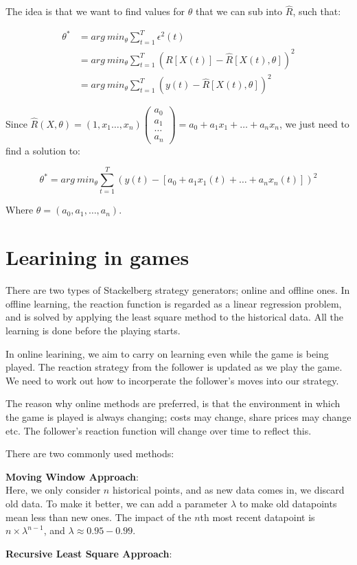 The idea is that we want to find values for $\theta$ that we can sub into
$\hat{R}$, such that:

\[
  \begin{split}
  \theta^* &= arg~min_\theta \sum^T_{t=1}\epsilon^2(t)\\
           &= arg~min_\theta \sum^T_{t=1}(R[X(t)] - \hat{R}[X(t), \theta])^2\\
           &= arg~min_\theta \sum^T_{t=1}(y(t) - \hat{R}[X(t), \theta])^2
  \end{split}
\]

Since $\hat{R}(X, \theta) = (1, x_1 \dots, x_n) \left( \begin{smallmatrix}
a_0\\ a_1\\ \dots \\ a_n \end{smallmatrix} \right) = a_0 + a_1x_1 + \dots +
a_nx_n$, we just need to find a solution to:

\[
  \theta^* = arg~min_\theta \sum^T_{t=1}(y(t) - [a_0 + a_1x_1(t) + \dots +
a_nx_n(t)])^2
\]

Where $\theta = (a_0, a_1, \dots, a_n)$.



\section{Learining in games}

There are two types of Stackelberg strategy generators; online and offline ones.
In offline learning, the reaction function is regarded as a linear regression
problem, and is solved by applying the least square method to the historical
data. All the learning is done before the playing starts.

In online learining, we aim to carry on learning even while the game is being
played. The reaction strategy from the follower is updated as we play the game.
We need to work out how to incorperate the follower's moves into our strategy.

The reason why online methods are preferred, is that the environment in which
the game is played is always changing; costs may change, share prices may change
etc. The follower's reaction function will change over time to reflect this.

There are two commonly used methods:

\begin{description}
  \item \textbf{Moving Window Approach}:\\
    Here, we only consider $n$ historical points, and as new data comes in, we
    discard old data.
    To make it better, we can add a parameter $\lambda$ to make old datapoints
    mean less than new ones. The impact of the $n$th most recent datapoint is
    $n \times \lambda ^{n-1}$, and $\lambda \approx 0.95-0.99$.
  \item \textbf{Recursive Least Square Approach}:\\
    
\end{description}

